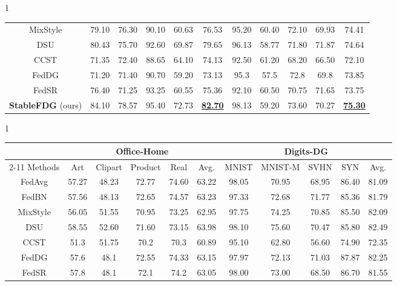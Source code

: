 \documentclass{article}
\theoremstyle{plain}
\theoremstyle{definition}
\theoremstyle{remark}
\begin{document}
\begin{table*}[!t]
\begin{subtable}[!t]{1\linewidth}
\begin{tabular}{c||cccc|c||cccc|c}
		MixStyle  \cite{zhou2021domain} & 79.10	&76.30	&90.10	&60.63	&76.53& 95.20&	60.40	&72.10&	69.93	&74.41 \\
		DSU  \cite{li2022uncertainty}  & 80.43	&75.70	&92.60&	69.87&	79.65 & 96.13&	58.77&	71.80&	71.87&	74.64\\
	      CCST \cite{chen2023federated}  &  71.35&	72.40&	88.65	&64.10&	74.13 &92.50&	61.20	&68.20&	66.50&	72.10 \\
	      FedDG  \cite{liu2021feddg}     & 71.20&	71.40	&90.70	&59.20	&73.13& 95.3&	57.5	&72.8	&69.8	&73.85\\
	      FedSR  \cite{nguyen2022fedsr}   & 76.40	&71.25	&93.25&	60.55	&75.36 &92.10&	60.50&	70.75&	71.65&	73.75\\
	      \textbf{StableFDG} (ours) & 84.10	&78.57&	95.40&	72.73&	\textbf{\underline{82.70}} &98.13&	59.20&	73.60&	70.27&	\textbf{\underline{75.30}} \\
		\bottomrule
	\end{tabular}
		\caption{PACS and VLCS datasets.}
\end{subtable}
\hfill
\newline
\begin{subtable}[!t]{1\linewidth}
 	\scriptsize
 	\centering
	\begin{tabular}{c||cccc|c||cccc|c}
		\toprule  
		&  \multicolumn{5}{c}{\textbf{Office-Home}} & \multicolumn{5}{c}{\textbf{Digits-DG}} \\
		\cmidrule{2-11}
	 Methods     & Art & Clipart	& Product & Real & Avg. & MNIST& MNIST-M & SVHN & SYN & Avg.  \\
		\midrule
		FedAvg  \cite{mcmahan2017communication}&  57.27	&48.23	&72.77&	74.60&	63.22& 98.05&	70.95	&68.95&	86.40	&81.09\\	
	FedBN \cite{lifedbn}   & 57.56&	48.13&	72.65	&74.57&	63.23   & 97.33	&72.68&	71.77	&85.36	&81.79  \\	
		MixStyle  \cite{zhou2021domain} & 56.05	&51.55 	&70.95&	73.25&	62.95& 97.75&	74.25	&70.85&	85.50	&82.09 \\
		DSU  \cite{li2022uncertainty}  & 58.55&	52.60&	71.60	&73.15	&63.98 &98.10&	75.60	&70.47	&85.80	&82.49\\
	      CCST \cite{chen2023federated}  &  51.3&	51.75	&70.2	&70.3&	60.89  &95.10	&62.80	&56.60	&74.90&	72.35 \\
	      FedDG  \cite{liu2021feddg}    & 57.6	&48.1	&72.55&	74.33	&63.15 & 97.97&	72.13	&71.03&	87.87	&82.25\\
	      FedSR  \cite{nguyen2022fedsr}    & 57.8&	48.1&	72.1	&74.2&	63.05& 98.00&	73.00&	68.50	&86.70	&81.55\\ 

\end{tabular}
\end{subtable}
\end{table*}
\end{document}
